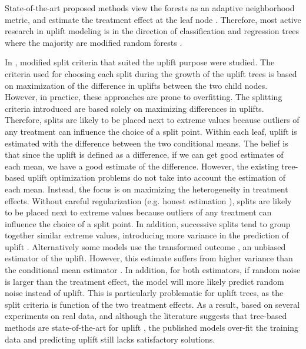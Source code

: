 \documentclass{article}
\begin{document}
State-of-the-art proposed methods view the forests as an adaptive neighborhood metric, and estimate the treatment effect at the leaf node \citep{su2009subgroup,chipman2010bart}. Therefore, most active research in uplift modeling is in the direction of classification and regression trees \citep{breiman1984classification} where the majority are modified random forests \citep{Breiman-RandomForest-2001}.

In \cite{radcliffe1999differential, radcliffe2011real,hansotia2002direct, hansotia2002incremental,jaskowski2012uplift}, modified split criteria that suited the uplift purpose were studied. The criteria used for choosing each split during the growth of the uplift trees is based on maximization of the difference in uplifts between the two child nodes. However, in practice, these approaches are prone to overfitting. The splitting criteria introduced are based solely on maximizing differences in uplifts. Therefore, splits are likely to be placed next to extreme values because outliers of any treatment can influence the choice of a split point. Within each leaf, uplift is estimated with the difference between the two conditional means. The belief is that since the uplift is defined as a difference, if we can get good estimates of each mean, we have a good estimate of the difference. However, the existing tree-based uplift optimization problems do not take into account the estimation of each mean. Instead, the focus is on maximizing the heterogeneity in treatment effects. Without careful regularization (e.g. honest estimation \citep{athey2019generalized}), splits are likely to be placed next to extreme values because outliers of any treatment can influence the choice of a split point. In addition, successive splits tend to group together similar extreme values, introducing more variance in the prediction of uplift \citep{zhao2017practically}. Alternatively some models use the transformed outcome \citep{athey2015machine}, an unbiased estimator of the uplift. However, this estimate suffers from higher variance than the conditional mean estimator \citep{powers2018some}. In addition, for both estimators, if random noise is larger than the treatment effect, the model will more likely predict random noise instead of uplift. This is particularly problematic for uplift trees, as the split criteria is function of the two treatment effects. As a result, based on several experiments on real data, and although the literature suggests that tree-based methods are state-of-the-art for uplift \citep{soltys2015ensemble}, the published models over-fit the training data and predicting uplift still lacks satisfactory solutions.
\end{document}
